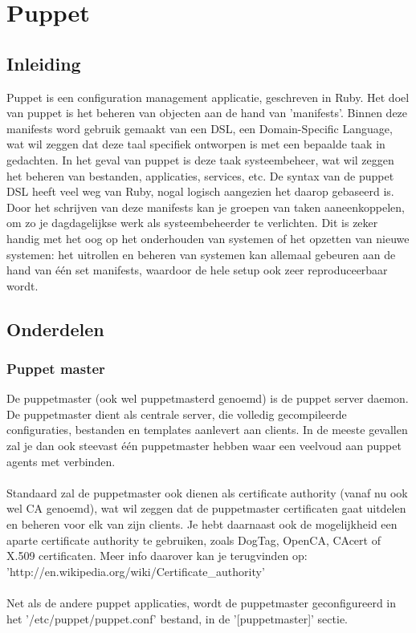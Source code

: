 \chapter{Puppet}

\section{Inleiding}
Puppet is een configuration management applicatie, geschreven in Ruby. Het doel van puppet is het beheren van objecten aan de hand van 'manifests'. Binnen deze manifests word gebruik gemaakt van een DSL, een Domain-Specific Language, wat wil zeggen dat deze taal specifiek ontworpen is met een bepaalde taak in gedachten. In het geval van puppet is deze taak systeembeheer, wat wil zeggen het beheren van bestanden, applicaties, services, etc. De syntax van de puppet DSL heeft veel weg van Ruby, nogal logisch aangezien het daarop gebaseerd is. Door het schrijven van deze manifests kan je groepen van taken aaneenkoppelen, om zo je dagdagelijkse werk als systeembeheerder te verlichten. Dit is zeker handig met het oog op het onderhouden van systemen of het opzetten van nieuwe systemen: het uitrollen en beheren van systemen kan allemaal gebeuren aan de hand van \'e\'en set manifests, waardoor de hele setup ook zeer reproduceerbaar wordt.

\section{Onderdelen}

\subsection{Puppet master}
De puppetmaster (ook wel puppetmasterd genoemd) is de puppet server daemon. De puppetmaster dient als centrale server, die volledig gecompileerde configuraties, bestanden en templates aanlevert aan clients. In de meeste gevallen zal je dan ook steevast \'e\'en puppetmaster hebben waar een veelvoud aan puppet agents met verbinden.\\\\
Standaard zal de puppetmaster ook dienen als certificate authority (vanaf nu ook wel CA genoemd), wat wil zeggen dat de puppetmaster certificaten gaat uitdelen en beheren voor elk van zijn clients. Je hebt daarnaast ook de mogelijkheid een aparte certificate authority te gebruiken, zoals DogTag, OpenCA, CAcert of X.509 certificaten. Meer info daarover kan je terugvinden op:\\
'http://en.wikipedia.org/wiki/Certificate\_authority'\\\\
Net als de andere puppet applicaties, wordt de puppetmaster geconfigureerd in het '/etc/puppet/puppet.conf' bestand, in de '[puppetmaster]' sectie.

